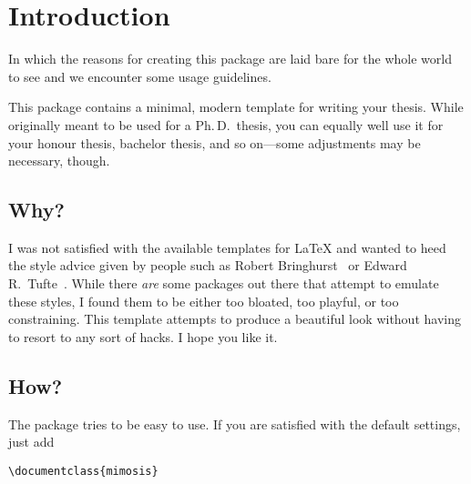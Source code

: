 \chapter{Introduction}

\begin{center}
	\begin{minipage}{0.5\textwidth}
		\begin{small}
			In which the reasons for creating this package are laid bare for the
			whole world to see and we encounter some usage guidelines.
		\end{small}
	\end{minipage}
	\vspace{0.5cm}
\end{center}

\noindent This package contains a minimal, modern template for writing your
thesis. While originally meant to be used for a Ph.\,D.\ thesis, you can
equally well use it for your honour thesis, bachelor thesis, and so
on---some adjustments may be necessary, though.

\section{Why?}

I was not satisfied with the available templates for \LaTeX{} and wanted
to heed the style advice given by people such as Robert
Bringhurst~\cite{Bringhurst12} or Edward R.\
Tufte~\cite{Tufte90,Tufte01}. While there \emph{are} some packages out
there that attempt to emulate these styles, I found them to be either
too bloated, too playful, or too constraining. This template attempts to
produce a beautiful look without having to resort to any sort of hacks.
I hope you like it.

\section{How?}

The package tries to be easy to use. If you are satisfied with the
default settings, just add
%
\begin{verbatim}
\documentclass{mimosis}
\end{verbatim}
%

